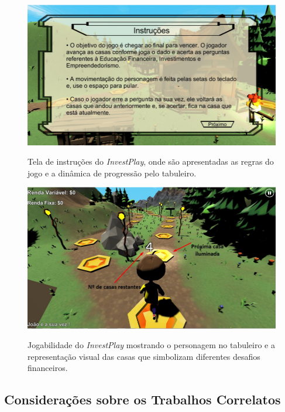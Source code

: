 \begin{figure}[ht]
	\centering
	\caption{Tela de instruções do \textit{InvestPlay}, onde são apresentadas as regras do jogo e a dinâmica de progressão pelo tabuleiro.}
	\includegraphics[scale=0.6]{Textuais/Pictures/invest-play-1.png}
	\label{fig:invest-play-1}
\end{figure}

\begin{figure}[ht]
	\centering
	\caption{Jogabilidade do \textit{InvestPlay} mostrando o personagem no tabuleiro e a representação visual das casas que simbolizam diferentes desafios financeiros.}
	\includegraphics[scale=0.6]{Textuais/Pictures/invest-play-2.png}
	\label{fig:invest-play-2}
\end{figure}

\newpage

\subsection{Considerações sobre os Trabalhos Correlatos}

